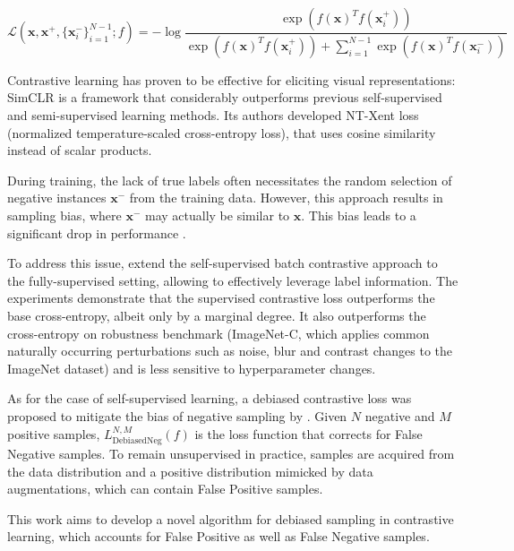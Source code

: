 \documentclass{article}
\begin{document}
\begin{equation} \label{eq:1}
\mathcal{L}(\textbf{x}, \textbf{x}^+, \{\textbf{x}_i^-\}_{i=1}^{N-1}; f) = - \log \frac{\exp(f(\textbf{x})^T f(\textbf{x}_i^+))}{\exp(f(\textbf{x})^T f(\textbf{x}_i^+)) + \sum _{i=1}^{N-1} \exp(f(\textbf{x})^Tf(\textbf{x}_i^-))}
\end{equation}

Contrastive learning has proven to be effective for eliciting visual representations: SimCLR \citep{chen2020simple} is a framework that considerably outperforms previous self-supervised and semi-supervised learning methods. Its authors developed NT-Xent loss (normalized temperature-scaled cross-entropy loss), that uses cosine similarity instead of scalar products.

During training, the lack of true labels often necessitates the random selection of negative instances $\textbf{x}^-$ from the training data. However, this approach results in sampling bias, where $\textbf{x}^-$ may actually be similar to $\textbf{x}$. This bias leads to a significant drop in performance \citep{NEURIPS2021_de8aa43e}.

To address this issue, \citep{khosla2021supervised} extend the self-supervised batch contrastive approach to the fully-supervised setting, allowing to effectively leverage label information. The experiments demonstrate that the supervised contrastive loss outperforms the base cross-entropy, albeit only by a marginal degree. It also outperforms the cross-entropy on robustness benchmark (ImageNet-C, which applies common naturally occurring perturbations such as noise, blur and contrast changes to the ImageNet dataset) and is less sensitive to hyperparameter changes.

As for the case of self-supervised learning, a debiased contrastive loss was proposed to mitigate the bias of negative sampling by \citep{chuang2020debiased}. Given $N$ negative and $M$ positive samples, $L^{N, M}_{\text{DebiasedNeg}} (f)$ is the loss function that corrects for False Negative samples. To remain unsupervised in practice, samples are acquired from the data distribution and a positive distribution mimicked by data augmentations, which can contain False Positive samples.

This work aims to develop a novel algorithm for debiased sampling in contrastive learning, which accounts for False Positive as well as False Negative samples. 

\end{document}
